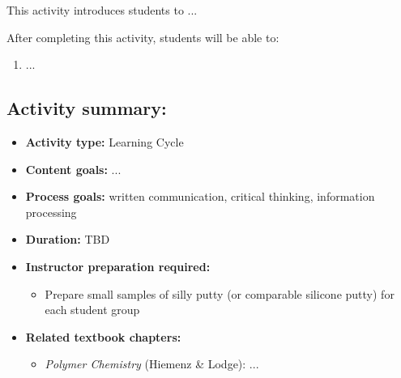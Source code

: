 %
%
%
%

\renewcommand{\figpath}{content/polymphys/mechanical-properties/viscoelasticity/figs}
\newcommand{\labelbase}{}
\renewcommand{\labelbase}{viscoelasticity}

\begin{activity}

\begin{instructornotes}

	This activity introduces students to ...
	
	After completing this activity, students will be able to:
			\begin{enumerate}
				\item ...
			\end{enumerate}
	
			
	\subsection*{Activity summary:}
	\begin{itemize}
		\item \textbf{Activity type:} Learning Cycle
		\item \textbf{Content goals:} ...
		\item \textbf{Process goals:} %
			written communication, critical thinking, information processing
		\item \textbf{Duration:} TBD %
		\item \textbf{Instructor preparation required:} 
			\begin{itemize}
				\item Prepare small samples of silly putty (or comparable silicone putty) for each student group
			\end{itemize}
		\item \textbf{Related textbook chapters:}
			\begin{itemize}
				\item \emph{Polymer Chemistry} (Hiemenz \& Lodge): ...
			\end{itemize}
	\end{itemize}


\end{instructornotes}
\end{activity}
